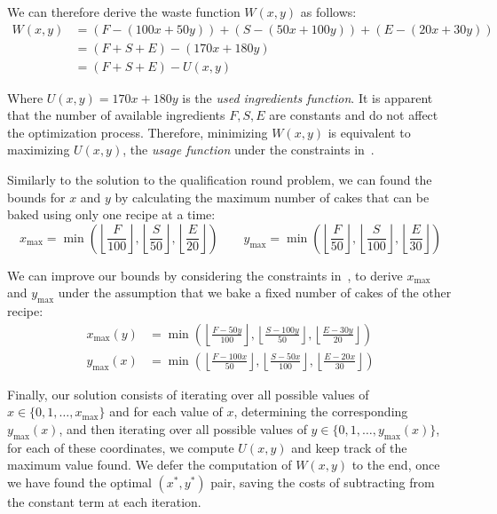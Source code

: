 \documentclass{solutionclass} %
\begin{document}
    We can therefore derive the waste function $W(x, y)$ as follows:
    \begin{align}
        W(x, y) &= (F - (100x + 50y)) + (S - (50x + 100y)) + (E - (20x + 30y)) \\
                &= (F + S + E) - (170x + 180y) \\
                &= (F + S + E) - U(x, y)
    \end{align}

    Where $U(x, y) = 170x + 180y$ is the \emph{used ingredients function}. It is apparent that the number of available ingredients $F, S, E$ are constants and do not affect the optimization process. Therefore, minimizing $W(x, y)$ is equivalent to maximizing $U(x, y)$, the \emph{usage function} under the constraints in~.

    Similarly to the solution to the qualification round problem, we can found the bounds for $x$ and $y$ by calculating the maximum number of cakes that can be baked using only one recipe at a time:
    \begin{equation}
        x_{\max} = \min\left(\left\lfloor\frac{F}{100}\right\rfloor, \left\lfloor\frac{S}{50}\right\rfloor, \left\lfloor\frac{E}{20}\right\rfloor\right) \qquad
        y_{\max} = \min\left(\left\lfloor\frac{F}{50}\right\rfloor, \left\lfloor\frac{S}{100}\right\rfloor, \left\lfloor\frac{E}{30}\right\rfloor\right)
    \end{equation}

    We can improve our bounds by considering the constraints in~, to derive $x_{\max}$ and $y_{\max}$ under the assumption that we bake a fixed number of cakes of the other recipe:
    \begin{align}
        x_{\max}(y) &= \min\left(\left\lfloor\frac{F - 50y}{100}\right\rfloor, \left\lfloor\frac{S - 100y}{50}\right\rfloor, \left\lfloor\frac{E - 30y}{20}\right\rfloor\right) \\[6pt]
        y_{\max}(x) &= \min\left(\left\lfloor\frac{F - 100x}{50}\right\rfloor, \left\lfloor\frac{S - 50x}{100}\right\rfloor, \left\lfloor\frac{E - 20x}{30}\right\rfloor\right)
    \end{align}

    Finally, our solution consists of iterating over all possible values of $x \in \{0, 1, \ldots, x_{\max}\}$ and for each value of $x$, determining the corresponding $y_{\max}(x)$, and then iterating over all possible values of $y \in \{0, 1, \ldots, y_{\max}(x)\}$, for each of these coordinates, we compute $U(x, y)$ and keep track of the maximum value found. We defer the computation of $W(x, y)$ to the end, once we have found the optimal $(x^*, y^*)$ pair, saving the costs of subtracting from the constant term at each iteration.
\end{document}
